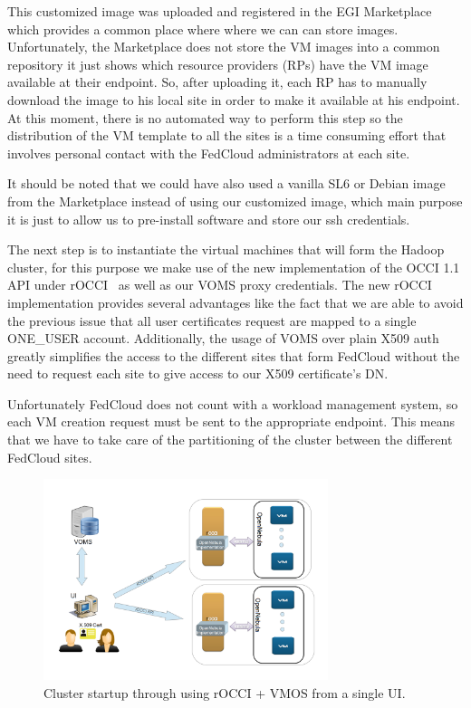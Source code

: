 \documentclass[oribibl]{llncs_Ibergrid2013}
\begin{document}
This customized image was uploaded and registered in the EGI Marketplace~\cite{marketplace} which provides a common place where where we can can store images. Unfortunately, the Marketplace does not store the VM images into a common repository it just shows which resource providers (RPs) have the VM image available at their endpoint. So, after uploading it, each RP has to manually download the image to his local site in order to make it available at his endpoint. At this moment, there is no automated way to perform this step so the distribution of the VM template to all the sites is a time consuming effort that involves personal contact with the FedCloud administrators at each site.

It should be noted that we could have also used a vanilla SL6 or Debian image from the Marketplace instead of using our customized image, which main purpose it is just to allow us to pre-install software and store our ssh credentials.


The next step is to instantiate the virtual machines that will form the Hadoop cluster, for this purpose we make use of the new implementation of the OCCI 1.1 API under rOCCI~\cite{rocci} as well as our VOMS proxy credentials. The new rOCCI implementation provides several advantages like the fact that we are able to avoid the previous issue that all user certificates request are mapped to a single ONE\_USER account.
Additionally, the usage of VOMS over plain X509 auth greatly simplifies the access to the different sites that form FedCloud without the need to request each site to give access to our X509 certificate's DN.

Unfortunately FedCloud does not count with a workload management system, so each VM creation request must be sent to the appropriate endpoint. This means that we have to take care of the partitioning of the cluster between the different FedCloud sites.


\begin{figure}[h]
\centering
\includegraphics[width=0.74\textwidth]{figures/client-v2.png}
\caption{Cluster startup through using rOCCI + VMOS from a single UI.}
\label{fig:client}
\end{figure}
\end{document}
